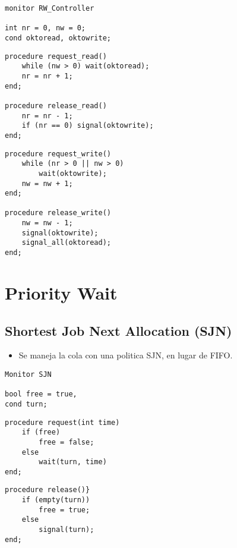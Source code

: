 \documentclass[a4paper, 10pt]{report}
\begin{document}
\begin{lstlisting}
monitor RW_Controller

int nr = 0, nw = 0;
cond oktoread, oktowrite;
\end{lstlisting}
\noindent
\begin{minipage}{0.5\textwidth}
\begin{lstlisting}[firstnumber=5]
procedure request_read()
	while (nw > 0) wait(oktoread);
	nr = nr + 1;
end;

procedure release_read()
	nr = nr - 1;
	if (nr == 0) signal(oktowrite);
end;
\end{lstlisting}
\end{minipage}%
\begin{minipage}{0.5\textwidth}
\noindent
\begin{lstlisting}[firstnumber=14]
procedure request_write()
	while (nr > 0 || nw > 0) 
		wait(oktowrite);
	nw = nw + 1;
end;

procedure release_write()
	nw = nw - 1;
	signal(oktowrite);
	signal_all(oktoread);
end;
\end{lstlisting}
\end{minipage}%

\section{Priority Wait}

\subsection{Shortest Job Next Allocation (SJN)}

\begin{itemize}
	\item Se maneja la cola con una politica SJN, en lugar de FIFO.
\end{itemize}

\begin{lstlisting}
Monitor SJN

bool free = true,
cond turn;
\end{lstlisting}
\noindent
\begin{minipage}{0.5\textwidth}
\begin{lstlisting}[firstnumber=5]
procedure request(int time)
	if (free) 
		free = false;
	else 
		wait(turn, time)
end;
\end{lstlisting}
\end{minipage}
\noindent
\begin{minipage}{0.5\textwidth}
\begin{lstlisting}[firstnumber=11]
procedure release()}
	if (empty(turn)) 
		free = true;
	else 
		signal(turn);
end;
\end{lstlisting}
\end{minipage}
\end{document}
